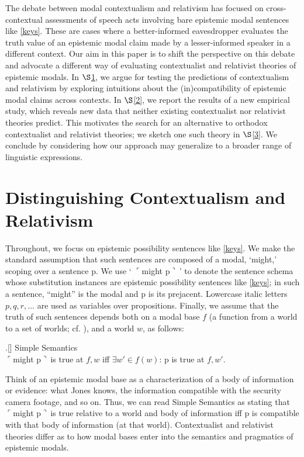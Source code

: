 \documentclass[11pt]{article}
\newcommand{\ul}{$\ulcorner$}
\newcommand{\ur}{$\urcorner\ $}
\begin{document}
\begin{doublespace}
The debate between modal contextualism and relativism has focused on cross-contextual assessments of speech acts involving bare epistemic modal sentences like \ref{keys}. These are cases where a better-informed eavesdropper evaluates the truth value of an epistemic modal claim made by a lesser-informed speaker in a different context. Our aim in this paper is to shift the perspective on this debate and advocate a different way of evaluating contextualist and relativist theories of epistemic modals. In $\S$\ref{1}, we argue for testing the predictions of contextualism and relativism by exploring intuitions about the (in)compatibility of epistemic modal claims across contexts. In $\S$\ref{2}, we report the results of a new empirical study, which reveals new data that neither existing contextualist nor relativist theories predict. This motivates the search for an alternative to orthodox contextualist and relativist theories; we sketch one such theory in $\S$\ref{3}. We conclude by considering how our approach may generalize to a broader range of linguistic expressions.

\section{Distinguishing Contextualism and Relativism}
\label{1}

Throughout, we focus on epistemic possibility sentences like \ref{keys}. We make the standard assumption that such sentences are composed of a modal, `might,' scoping over a sentence p. We use ` \ul might p\ur ' to denote the sentence schema whose substitution instances are epistemic possibility sentences like \ref{keys}; in such a sentence, ``might'' is the modal and p is its prejacent. Lowercase italic letters $p, q, r, \dots$ are used as variables over propositions. Finally, we assume that the truth of such sentences depends both on a modal base $f$ (a function from a world to a set of worlds; cf. \citealt{kratzer:1981}), and a world $w$, as follows:

\ex.[] {\sc Simple Semantics}\\
	{\ul might p\ur is true at $f,w$ iff $\exists w'\in f(w)$: p is true at $f,w'$.} 

Think of an epistemic modal base as a characterization of a body of information or evidence: what Jones knows, the information compatible with the security camera footage, and so on. Thus, we can read {\sc Simple Semantics} as stating that \ul might p\ur is true relative to a world and body of information iff p is compatible with that body of information (at that world). Contextualist and relativist theories differ as to how modal bases enter into the semantics and pragmatics of epistemic modals. 


\end{doublespace}
\end{document}
